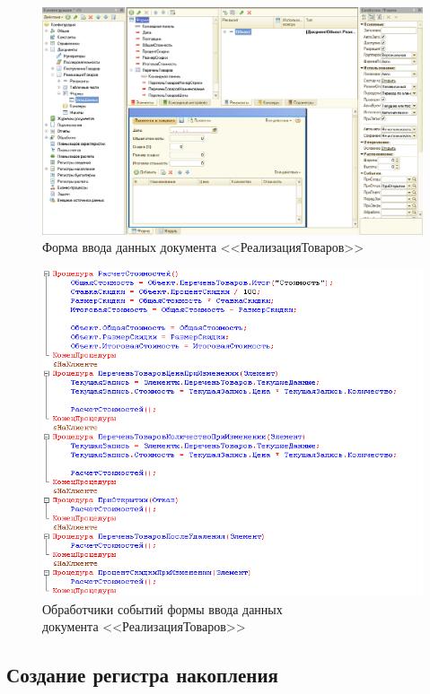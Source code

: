 \begin{figure}[h!]
  \centering
  \includegraphics[width=130mm]{pic/doc_output_form}
  \caption{Форма ввода данных документа <<РеализацияТоваров>>}
  \label{fig:doc_output_form}
\end{figure}

\begin{figure}[h!]
  \centering
  \includegraphics[width=130mm]{pic/doc_output_module}
  \caption{Обработчики событий формы ввода данных \\
    документа <<РеализацияТоваров>>}
  \label{fig:doc_output_module}
\end{figure}

\pagebreak

\subsection{Создание регистра накопления}

